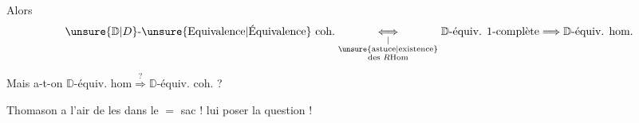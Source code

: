 Alors
\[
\unsure{\mathbb D|D}\text{-\unsure{Equivalence|Équivalence} coh.}
\underset{\substack{\vert\\\text{\unsure{astuce|existence}}\\\text{des }R\mathrm{Hom}}}{\Longleftrightarrow}
\mathbb D\text{-équiv. 1-complète}\Longrightarrow\mathbb D\text{-équiv. hom.}
\]

Mais a-t-on $\mathbb D\text{-équiv. hom}\overset{?}{\Longrightarrow}\mathbb D\text{-équiv. coh.}$ ?

Thomason a l'air de les  dans le $=$ sac ! lui poser la question !
